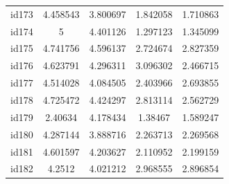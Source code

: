 \documentclass[entropy,article,submit,moreauthors,LaTeX and dvi2pdf]{Definitions/mdpi}
\begin{document}
\begin{center}
\begin{longtable}{ccccc}
id173     & 4.458543  & 3.800697       & 1.842058          & 1.710863          \\
id174     & 5         & 4.401126       & 1.297123          & 1.345099          \\
id175     & 4.741756  & 4.596137       & 2.724674          & 2.827359          \\
id176     & 4.623791  & 4.296311       & 3.096302          & 2.466715          \\
id177     & 4.514028  & 4.084505       & 2.403966          & 2.693855          \\
id178     & 4.725472  & 4.424297       & 2.813114          & 2.562729          \\
id179     & 2.40634   & 4.178434       & 1.38467           & 1.589247          \\
id180     & 4.287144  & 3.888716       & 2.263713          & 2.269568          \\
id181     & 4.601597  & 4.203627       & 2.110952          & 2.199159          \\
id182     & 4.2512    & 4.021212       & 2.968555          & 2.896854\\
\bottomrule
\end{longtable}
\end{center}





%
\end{document}

